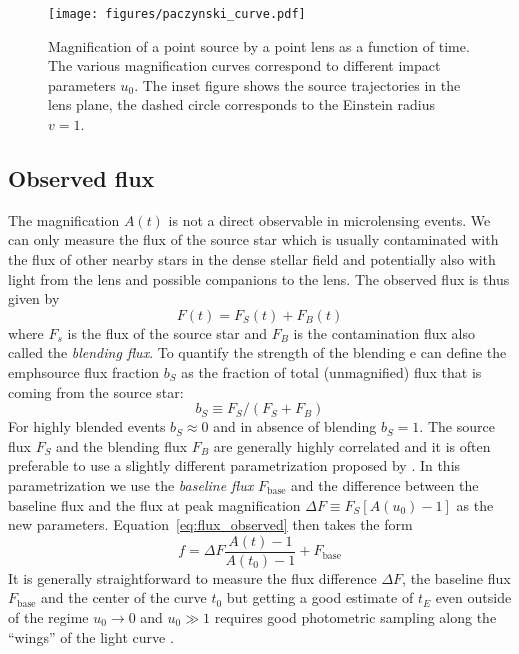 \documentclass[12pt]{report}
\begin{document}
\begin{figure}[t]
    \begin{centering}
        \texttt{[image: figures/paczynski\_curve.pdf]}
        \caption{
            Magnification of a point source by a point lens as a function of time. The
            various magnification curves correspond to different impact parameters $u_0$.
            The inset figure
            shows the source trajectories in the lens plane, the dashed circle corresponds
            to the Einstein radius $v=1$.}
        \label{fig:paczynski_curve}
    \end{centering}
\end{figure}

\subsection{Observed flux}
The magnification $A(t)$ is not a direct observable in microlensing events. We
can only measure the flux of the source star which is usually contaminated with
the flux of other nearby stars in the dense stellar field and potentially also
with light from the lens and possible companions to the lens. The observed flux
is thus given by
\begin{equation}
    F(t)=F_S(t)+F_B(t)
    \label{eq:flux_observed}
\end{equation}
where $F_s$ is the flux of the source star and $F_B$ is the contamination flux also
called the \emph{blending flux}. To quantify the strength of the blending e can
define the emph{source flux fraction} $b_S$ as the fraction of total (unmagnified)
flux that is coming from the source star:
\begin{equation}
    b_S\equiv F_S/(F_S + F_B)
\end{equation}
For highly blended events $b_S\approx 0$ and in absence of blending $b_S=1$.
The source flux $F_S$ and the blending flux $F_B$ are generally highly correlated
and it is often preferable to use a slightly different parametrization proposed by
\citet{2009MNRAS.393..816D}. In this parametrization we use the
\emph{baseline flux} $F_\mathrm{base}$ and the difference between
the baseline flux and the flux at peak magnification $\Delta F\equiv F_S[A(u_0)-1]$
as the new parameters.
Equation~\ref{eq:flux_observed} then takes the form
\begin{equation}
    f=\Delta F\frac{A(t) - 1}{A(t_0)-1}+F_\mathrm{base}
    \label{eq:flux_dominik}
\end{equation}
It is generally straightforward to measure the flux difference $\Delta F$, the
baseline flux $F_\mathrm{base}$ and the center of the curve $t_0$ but getting a
good estimate of $t_E$ even outside of the regime $u_0\rightarrow 0$ and
$u_0\gg 1$ requires good photometric sampling along the ``wings'' of the light
curve \citep{2009MNRAS.393..816D}.
\end{document}

